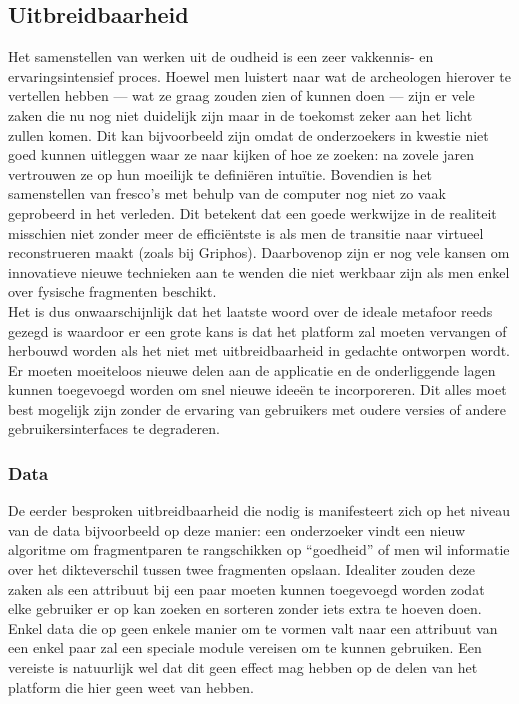 \subsection{Uitbreidbaarheid}
Het samenstellen van werken uit de oudheid is een zeer vakkennis- en ervaringsintensief proces. Hoewel men luistert naar wat de archeologen hierover te vertellen hebben --- wat ze graag zouden zien of kunnen doen --- zijn er vele zaken die nu nog niet duidelijk zijn maar in de toekomst zeker aan het licht zullen komen. Dit kan bijvoorbeeld zijn omdat de onderzoekers in kwestie niet goed kunnen uitleggen waar ze naar kijken of hoe ze zoeken: na zovele jaren vertrouwen ze op hun moeilijk te defini\"eren intu\"itie. Bovendien is het samenstellen van fresco's met behulp van de computer nog niet zo vaak geprobeerd in het verleden. Dit betekent dat een goede werkwijze in de realiteit misschien niet zonder meer de effici\"entste is als men de transitie naar virtueel reconstrueren maakt (zoals bij Griphos). Daarbovenop zijn er nog vele kansen om innovatieve nieuwe technieken aan te wenden die niet werkbaar zijn als men enkel over fysische fragmenten beschikt.\\

Het is dus onwaarschijnlijk dat het laatste woord over de ideale metafoor reeds gezegd is waardoor er een grote kans is dat het platform zal moeten vervangen of herbouwd worden als het niet met uitbreidbaarheid in gedachte ontworpen wordt. Er moeten moeiteloos nieuwe delen aan de applicatie en de onderliggende lagen kunnen toegevoegd worden om snel nieuwe idee\"en te incorporeren. Dit alles moet best mogelijk zijn zonder de ervaring van gebruikers met oudere versies of andere gebruikersinterfaces te degraderen.

\subsubsection{Data}
De eerder besproken uitbreidbaarheid die nodig is manifesteert zich op het niveau van de data bijvoorbeeld op deze manier: een onderzoeker vindt een nieuw algoritme om fragmentparen te rangschikken op ``goedheid'' of men wil informatie over het dikteverschil tussen twee fragmenten opslaan. Idealiter zouden deze zaken als een attribuut bij een paar moeten kunnen toegevoegd worden zodat elke gebruiker er op kan zoeken en sorteren zonder iets extra te hoeven doen.\\
 
Enkel data die op geen enkele manier om te vormen valt naar een attribuut van een enkel paar zal een speciale module vereisen om te kunnen gebruiken. Een vereiste is natuurlijk wel dat dit geen effect mag hebben op de delen van het platform die hier geen weet van hebben.
 
